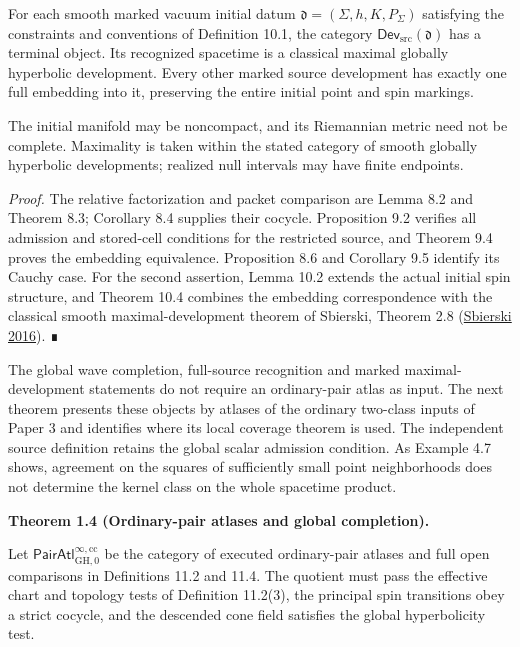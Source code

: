 \documentclass[
  english,
  11pt,
  reqno]{amsart}
\makeatletter
\newcommand{\pandocstatementheading}[1]{%
  \par\if@nobreak\else
    \addpenalty{\@beginparpenalty}%
    \addvspace{.5\baselineskip plus .2\baselineskip minus .2\baselineskip}%
  \fi
  {\normalfont\bfseries #1\par}%
  \nobreak\@afterindenttrue\@afterheading
}
\makeatother
\begin{document}
For each smooth marked vacuum initial datum
\(\mathfrak d=(\Sigma,h,K,P_\Sigma)\) satisfying the constraints and
conventions of Definition 10.1, the category
\(\mathsf{Dev}_{\mathrm{src}}(\mathfrak d)\) has a terminal object. Its
recognized spacetime is a classical maximal globally hyperbolic
development. Every other marked source development has exactly one full
embedding into it, preserving the entire initial point and spin
markings.

The initial manifold may be noncompact, and its Riemannian metric need
not be complete. Maximality is taken within the stated category of
smooth globally hyperbolic developments; realized null intervals may
have finite endpoints.

\emph{Proof.} The relative factorization and packet comparison are Lemma
8.2 and Theorem 8.3; Corollary 8.4 supplies their cocycle. Proposition
9.2 verifies all admission and stored-cell conditions for the restricted
source, and Theorem 9.4 proves the embedding equivalence. Proposition
8.6 and Corollary 9.5 identify its Cauchy case. For the second
assertion, Lemma 10.2 extends the actual initial spin structure, and
Theorem 10.4 combines the embedding correspondence with the classical
smooth maximal-development theorem of Sbierski, Theorem 2.8
(\hyperref[ref-Sbierski2016]{Sbierski 2016}). ∎

The global wave completion, full-source recognition and marked
maximal-development statements do not require an ordinary-pair atlas as
input. The next theorem presents these objects by atlases of the
ordinary two-class inputs of Paper 3 and identifies where its local
coverage theorem is used. The independent source definition retains the
global scalar admission condition. As Example 4.7 shows, agreement on
the squares of sufficiently small point neighborhoods does not determine
the kernel class on the whole spacetime product.

\pandocstatementheading{\protect{}\label{thm:ordinary-atlas-completion-overview}Theorem 1.4 (Ordinary-pair atlases and global completion).}

Let \(\mathsf{PairAtl}^{\infty,\mathrm{cc}}_{\mathrm{GH},0}\) be the
category of executed ordinary-pair atlases and full open comparisons in
Definitions 11.2 and 11.4. The quotient must pass the effective chart
and topology tests of Definition 11.2(3), the principal spin transitions
obey a strict cocycle, and the descended cone field satisfies the global
hyperbolicity test.
\end{document}
